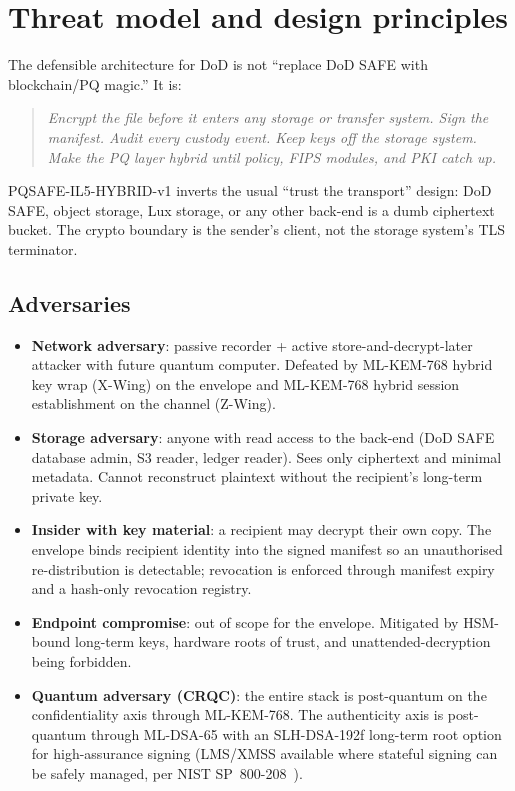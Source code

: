 \documentclass[11pt,a4paper]{article}
\begin{document}
\tableofcontents

\section{Threat model and design principles}
\label{sec:threat}

The defensible architecture for DoD is not ``replace DoD SAFE with
blockchain/PQ magic.'' It is:
\begin{quote}
\emph{Encrypt the file before it enters any storage or transfer system.
Sign the manifest. Audit every custody event. Keep keys off the
storage system. Make the PQ layer hybrid until policy, FIPS modules,
and PKI catch up.}
\end{quote}

PQSAFE-IL5-HYBRID-v1 inverts the usual ``trust the transport'' design:
DoD SAFE, object storage, Lux storage, or any other back-end is a dumb
ciphertext bucket. The crypto boundary is the sender's client, not the
storage system's TLS terminator.

\subsection{Adversaries}

\begin{itemize}[leftmargin=*,itemsep=0pt]
\item \textbf{Network adversary}: passive recorder + active
  store-and-decrypt-later attacker with future quantum computer.
  Defeated by ML-KEM-768 hybrid key wrap (X-Wing) on the envelope and
  ML-KEM-768 hybrid session establishment on the channel (Z-Wing).
\item \textbf{Storage adversary}: anyone with read access to the
  back-end (DoD SAFE database admin, S3 reader, ledger reader). Sees
  only ciphertext and minimal metadata. Cannot reconstruct plaintext
  without the recipient's long-term private key.
\item \textbf{Insider with key material}: a recipient may decrypt
  their own copy. The envelope binds recipient identity into the
  signed manifest so an unauthorised re-distribution is detectable;
  revocation is enforced through manifest expiry and a hash-only
  revocation registry.
\item \textbf{Endpoint compromise}: out of scope for the envelope.
  Mitigated by HSM-bound long-term keys, hardware roots of trust, and
  unattended-decryption being forbidden.
\item \textbf{Quantum adversary (CRQC)}: the entire stack is
  post-quantum on the confidentiality axis through ML-KEM-768. The
  authenticity axis is post-quantum through ML-DSA-65 with an
  SLH-DSA-192f long-term root option for high-assurance signing
  (LMS/XMSS available where stateful signing can be safely managed,
  per NIST SP~800-208~\cite{sp800208}).
\end{itemize}
\end{document}
